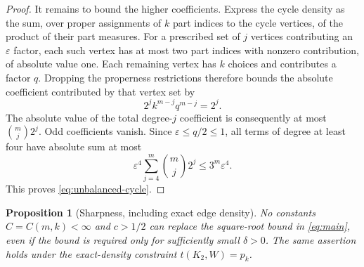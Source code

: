 \documentclass[11pt]{article}
\newtheorem{proposition}[lemma]{Proposition}
\theoremstyle{remark}
\begin{document}
\begin{proof}
It remains to bound the higher coefficients.
Express the cycle density as the sum, over proper assignments of
$k$ part indices to the cycle vertices, of the product of their
part measures. For a prescribed set of $j$ vertices contributing
an $\varepsilon$ factor, each such vertex has at most two part
indices with nonzero contribution, of absolute value one.
Each remaining vertex has $k$ choices and contributes a factor $q$.
Dropping the properness restrictions therefore bounds the absolute
coefficient contributed by that vertex set by
\[
 2^j k^{m-j}q^{m-j}=2^j.
\]
The absolute value of the total degree-$j$ coefficient is consequently
at most $\binom mj2^j$. Odd coefficients vanish. Since
$\varepsilon\leq q/2\leq1$, all terms of degree at least four have
absolute sum at most
\[
 \varepsilon^4\sum_{j=4}^m\binom mj2^j
 \leq3^m\varepsilon^4.
\]
This proves \eqref{eq:unbalanced-cycle}.
\end{proof}

\begin{proposition}[Sharpness, including exact edge density]
\label{prop:sharpness}
No constants $C=C(m,k)<\infty$ and $c>1/2$ can replace the
square-root bound in \eqref{eq:main}, even if the bound is required
only for sufficiently small $\delta>0$.
The same assertion holds under the exact-density constraint
$t(K_2,W)=p_k$.
\end{proposition}
\end{document}
